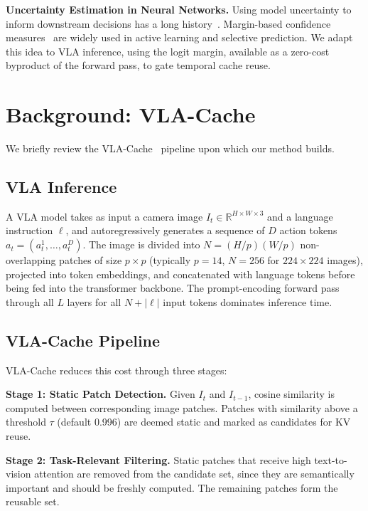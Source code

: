 \documentclass[letterpaper, 10 pt, conference]{ieeeconf}  %
\begin{document}
\textbf{Uncertainty Estimation in Neural Networks.}
Using model uncertainty to inform downstream decisions has a long
history~\cite{gal2016dropout,lakshminarayanan2017simple,hendrycks2016baseline}.
Margin-based confidence measures~\cite{settles2009active} are widely used
in active learning and selective prediction.
We adapt this idea to VLA inference, using the logit
margin, available as a zero-cost byproduct of the forward pass, to
gate temporal cache reuse.


\section{Background: VLA-Cache}\label{sec:background}

We briefly review the VLA-Cache~\cite{xu2025vlacache} pipeline upon
which our method builds.

\subsection{VLA Inference}
A VLA model takes as input a camera image $I_t \in \mathbb{R}^{H \times W
\times 3}$ and a language instruction $\ell$, and autoregressively
generates a sequence of $D$ action tokens $a_t = (a_t^1, \dots, a_t^D)$.
The image is divided into $N = (H/p)(W/p)$ non-overlapping patches of
size $p \times p$ (typically $p\!=\!14$, $N\!=\!256$ for $224 \times 224$
images), projected into token embeddings, and concatenated with language
tokens before being fed into the transformer backbone.
The prompt-encoding forward pass through all $L$ layers for all
$N + |\ell|$ input tokens dominates inference time.

\subsection{VLA-Cache Pipeline}
VLA-Cache reduces this cost through three stages:

\textbf{Stage 1: Static Patch Detection.}
Given $I_t$ and $I_{t-1}$, cosine similarity is computed between
corresponding image patches.
Patches with similarity above a threshold $\tau$ (default
0.996) are deemed static and marked as candidates for KV reuse.

\textbf{Stage 2: Task-Relevant Filtering.}
Static patches that receive high text-to-vision attention are removed from
the candidate set, since they are semantically important and should be
freshly computed.
The remaining patches form the reusable set.
\end{document}
